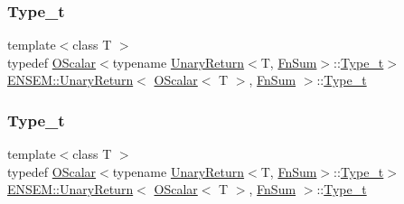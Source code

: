 \subsubsection{\texorpdfstring{Type\_t}{Type\_t}\hspace{0.1cm}{\footnotesize\ttfamily [1/3]}}
{\footnotesize\ttfamily template$<$class T $>$ \\
typedef \mbox{\hyperlink{classENSEM_1_1OScalar}{O\+Scalar}}$<$typename \mbox{\hyperlink{structENSEM_1_1UnaryReturn}{Unary\+Return}}$<$T, \mbox{\hyperlink{structENSEM_1_1FnSum}{Fn\+Sum}}$>$\+::\mbox{\hyperlink{structENSEM_1_1UnaryReturn_3_01OScalar_3_01T_01_4_00_01FnSum_01_4_a02ee406ef93cadbda63ffae33a8ef25a}{Type\+\_\+t}}$>$ \mbox{\hyperlink{structENSEM_1_1UnaryReturn}{E\+N\+S\+E\+M\+::\+Unary\+Return}}$<$ \mbox{\hyperlink{classENSEM_1_1OScalar}{O\+Scalar}}$<$ T $>$, \mbox{\hyperlink{structENSEM_1_1FnSum}{Fn\+Sum}} $>$\+::\mbox{\hyperlink{structENSEM_1_1UnaryReturn_3_01OScalar_3_01T_01_4_00_01FnSum_01_4_a02ee406ef93cadbda63ffae33a8ef25a}{Type\+\_\+t}}}

\mbox{\label{structENSEM_1_1UnaryReturn_3_01OScalar_3_01T_01_4_00_01FnSum_01_4_a02ee406ef93cadbda63ffae33a8ef25a}} 
\subsubsection{\texorpdfstring{Type\_t}{Type\_t}\hspace{0.1cm}{\footnotesize\ttfamily [2/3]}}
{\footnotesize\ttfamily template$<$class T $>$ \\
typedef \mbox{\hyperlink{classENSEM_1_1OScalar}{O\+Scalar}}$<$typename \mbox{\hyperlink{structENSEM_1_1UnaryReturn}{Unary\+Return}}$<$T, \mbox{\hyperlink{structENSEM_1_1FnSum}{Fn\+Sum}}$>$\+::\mbox{\hyperlink{structENSEM_1_1UnaryReturn_3_01OScalar_3_01T_01_4_00_01FnSum_01_4_a02ee406ef93cadbda63ffae33a8ef25a}{Type\+\_\+t}}$>$ \mbox{\hyperlink{structENSEM_1_1UnaryReturn}{E\+N\+S\+E\+M\+::\+Unary\+Return}}$<$ \mbox{\hyperlink{classENSEM_1_1OScalar}{O\+Scalar}}$<$ T $>$, \mbox{\hyperlink{structENSEM_1_1FnSum}{Fn\+Sum}} $>$\+::\mbox{\hyperlink{structENSEM_1_1UnaryReturn_3_01OScalar_3_01T_01_4_00_01FnSum_01_4_a02ee406ef93cadbda63ffae33a8ef25a}{Type\+\_\+t}}}

